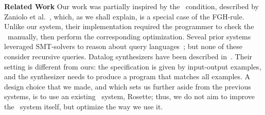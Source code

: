 \textbf{Related Work} Our work was partially inspired by the \prem\
condition, described by Zaniolo et
al.~\cite{DBLP:journals/tplp/ZanioloYDSCI17}, which, as we shall
explain, is a special case of the FGH-rule.  Unlike our system, their
implementation required the programmer to check the \prem\ manually,
then perform the corresponding optimization.
%
Seveal prior systems  leveraged SMT-solvers to reason about
query languages~\cite{
  DBLP:conf/icfem/VeanesGHT09,
  DBLP:conf/cidr/ChuWWC17,
  DBLP:conf/cav/GrossmanCIRS17,
  DBLP:conf/sosp/SchlaipferRLS17,
  DBLP:journals/pacmpl/0001DLC18};
but none of these  consider recursive queries.
%
Datalog synthesizers have been described in~\cite{
  DBLP:conf/cp/AlbarghouthiKNS17,
  DBLP:conf/sigsoft/SiLZAKN18,
  DBLP:conf/ijcai/SiRHN19,
  DBLP:journals/pvldb/WangSCPD20,
  DBLP:journals/pacmpl/RaghothamanMZNS20}.
Their setting is different from ours:
the specification is given by input-output examples, and the
synthesizer needs to produce a program that matches all examples.
A design choice that we made, and which sets us further aside from the
previous systems, is to use an existing \cegis\ system, Rosette; thus,
we do not aim to  improve the \cegis\ system itself, but optimize the
way we use it.

% 

